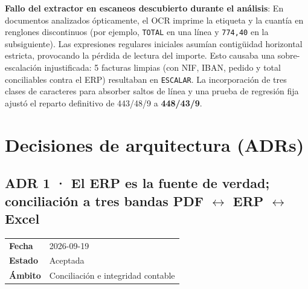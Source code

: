\documentclass[11pt,a4paper]{article}
\begin{document}
\textbf{Fallo del extractor en escaneos descubierto durante el análisis}: En documentos analizados ópticamente, el OCR imprime la etiqueta y la cuantía en renglones discontinuos (por ejemplo, \texttt{TOTAL} en una línea y \texttt{774,40} en la subsiguiente). Las expresiones regulares iniciales asumían contigüidad horizontal estricta, provocando la pérdida de lectura del importe. Esto causaba una sobre-escalación injustificada: 5 facturas limpias (con NIF, IBAN, pedido y total conciliables contra el ERP) resultaban en \texttt{ESCALAR}. La incorporación de tres clases de caracteres para absorber saltos de línea y una prueba de regresión fija ajustó el reparto definitivo de 443/48/9 a \textbf{448/43/9}.

\section{Decisiones de arquitectura (ADRs)}

\subsection{ADR 1 · El ERP es la fuente de verdad; conciliación a tres bandas PDF $\leftrightarrow$ ERP $\leftrightarrow$ Excel}
\begin{table}[htbp]
\centering\small
\begin{tabular}{ll}
\toprule
\textbf{Fecha} & 2026-09-19 \\
\textbf{Estado} & Aceptada \\
\textbf{Ámbito} & Conciliación e integridad contable \\
\bottomrule
\end{tabular}
\end{table}
\end{document}
